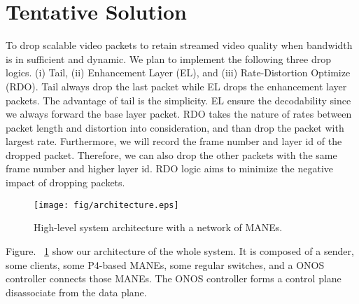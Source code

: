 \section{Tentative Solution} \label{sec:Tentive Soution}

To drop scalable video packets to retain streamed video quality when bandwidth is in sufficient and dynamic. We plan to implement the following three drop logics. (i) Tail, (ii) Enhancement Layer (EL), and (iii) Rate-Distortion Optimize (RDO). Tail always drop the last packet while EL drops the enhancement layer packets.  The advantage of tail is the simplicity. EL ensure the decodability since we always forward the base layer packet. RDO takes the nature of rates between packet length and distortion into consideration, and than drop the packet with largest rate. Furthermore, we will record the frame number and layer id of the dropped packet. Therefore, we can also drop the other packets with the same frame number and higher layer id. RDO logic aims to minimize the negative impact of dropping packets. 

\begin{figure}[tbh]
    \centering
    \texttt{[image: fig/architecture.eps]}
    \caption{High-level system architecture with a network of MANEs.}
\vspace{-0.1cm}
    \label{architecture} 
\end{figure}

Figure. ~\ref{architecture} show our architecture of the whole system. It is composed of a sender, some clients, some P4-based MANEs, some regular switches, and a ONOS controller connects those MANEs. The ONOS controller forms a control plane disassociate from the data plane. 
